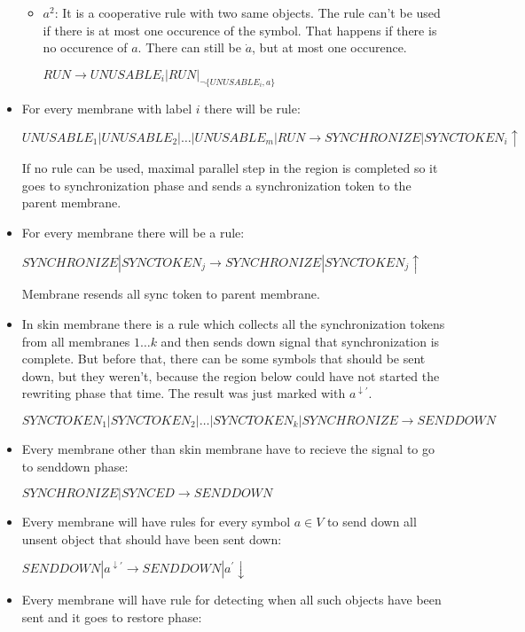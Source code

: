\documentclass[a4paper,10pt]{article}
\begin{document}
\begin{dokaz}
\begin{itemize}
\begin{itemize}
      \item $a^2$: It is a cooperative rule with two same objects. The rule can't be used if there is at most one occurence of the symbol. That happens if there is no occurence of $a$. There can still be $\dot{a}$, but at most one occurence.

      $RUN \rightarrow UNUSABLE_i|RUN|_{\neg\{UNUSABLE_i, a\}}$
    \end{itemize}

    

    \item For every membrane with label $i$ there will be rule:

    $UNUSABLE_1|UNUSABLE_2|\dots|UNUSABLE_m|RUN \rightarrow SYNCHRONIZE|SYNCTOKEN_i\uparrow$

    If no rule can be used, maximal parallel step in the region is completed so it goes to synchronization phase and sends a synchronization token to the parent membrane.

    \item For every membrane there will be a rule:

    $SYNCHRONIZE|SYNCTOKEN_j \rightarrow SYNCHRONIZE|SYNCTOKEN_j\uparrow$

    Membrane resends all sync token to parent membrane.

    \item In skin membrane there is a rule which collects all the synchronization tokens from all membranes $1\dots k$ and then sends down signal that synchronization is complete. But before that, there can be some symbols that should be sent down, but they weren't, because the region below could have not started the rewriting phase that time. The result was just marked with $a^{\downarrow\prime}$.

    $SYNCTOKEN_1|SYNCTOKEN_2|\dots|SYNCTOKEN_k|SYNCHRONIZE \rightarrow SENDDOWN$

    \item Every membrane other than skin membrane have to recieve the signal to go to senddown phase:

    $SYNCHRONIZE|SYNCED \rightarrow SENDDOWN$

    \item Every membrane will have rules for every symbol $a\in V$ to send down all unsent object that should have been sent down:

    $SENDDOWN|a^{\downarrow\prime} \rightarrow SENDDOWN|a^{\prime}\downarrow$

    \item Every membrane will have rule for detecting when all such objects have been sent and it goes to restore phase:


\end{itemize}
\end{dokaz}
\end{document}
